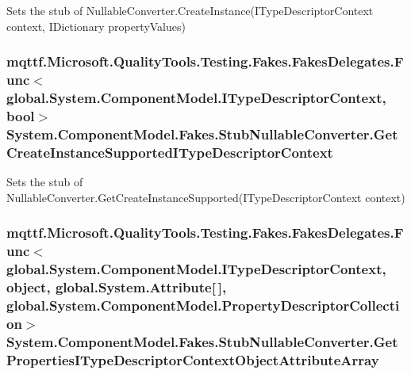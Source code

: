Sets the stub of Nullable\-Converter.\-Create\-Instance(\-I\-Type\-Descriptor\-Context context, I\-Dictionary property\-Values)

\hypertarget{class_system_1_1_component_model_1_1_fakes_1_1_stub_nullable_converter_aa2e8e4e857dff483f263229504574756}{
\subsubsection[{Get\-Create\-Instance\-Supported\-I\-Type\-Descriptor\-Context}]{\setlength{\rightskip}{0pt plus 5cm}mqttf.\-Microsoft.\-Quality\-Tools.\-Testing.\-Fakes.\-Fakes\-Delegates.\-Func$<$global.\-System.\-Component\-Model.\-I\-Type\-Descriptor\-Context, bool$>$ System.\-Component\-Model.\-Fakes.\-Stub\-Nullable\-Converter.\-Get\-Create\-Instance\-Supported\-I\-Type\-Descriptor\-Context}}\label{class_system_1_1_component_model_1_1_fakes_1_1_stub_nullable_converter_aa2e8e4e857dff483f263229504574756}


Sets the stub of Nullable\-Converter.\-Get\-Create\-Instance\-Supported(\-I\-Type\-Descriptor\-Context context)

\hypertarget{class_system_1_1_component_model_1_1_fakes_1_1_stub_nullable_converter_a119ee3811381aca5daedfe54266578bd}{
\subsubsection[{Get\-Properties\-I\-Type\-Descriptor\-Context\-Object\-Attribute\-Array}]{\setlength{\rightskip}{0pt plus 5cm}mqttf.\-Microsoft.\-Quality\-Tools.\-Testing.\-Fakes.\-Fakes\-Delegates.\-Func$<$global.\-System.\-Component\-Model.\-I\-Type\-Descriptor\-Context, object, global.\-System.\-Attribute\mbox{[}$\,$\mbox{]}, global.\-System.\-Component\-Model.\-Property\-Descriptor\-Collection$>$ System.\-Component\-Model.\-Fakes.\-Stub\-Nullable\-Converter.\-Get\-Properties\-I\-Type\-Descriptor\-Context\-Object\-Attribute\-Array}}\label{class_system_1_1_component_model_1_1_fakes_1_1_stub_nullable_converter_a119ee3811381aca5daedfe54266578bd}


